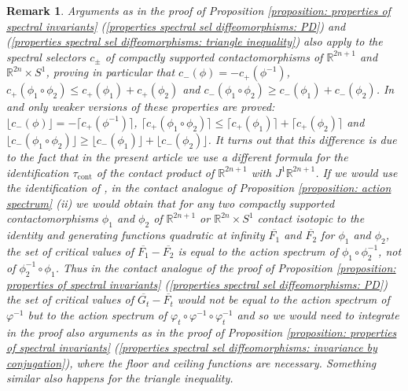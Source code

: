 \documentclass{amsart}
\DeclareMathOperator{\cont}{cont}
\newtheorem{remark}[thm]{Remark}
\theoremstyle{remark}
\begin{document}
\begin{remark}\label{remark: properties for contactomorphisms}
Arguments as in the proof
of Proposition \ref{proposition: properties of spectral invariants}
(\ref{properties spectral sel diffeomorphisms: PD})
and (\ref{properties spectral sel diffeomorphisms: triangle inequality})
also apply
to the spectral selectors $c_{\pm}$
of compactly supported contactomorphisms
of $\mathbb{R}^{2n+1}$ and $\mathbb{R}^{2n} \times S^1$,
proving in particular that $c_-(\phi) = - c_+ (\phi^{-1})$,
$c_+ (\phi_1 \circ \phi_2) \leq c_+ (\phi_1) + c_+ (\phi_2)$
and $c_- (\phi_1 \circ \phi_2) \geq c_- (\phi_1) + c_- (\phi_2)$.
In \cite{San11} and \cite{San10}
only weaker versions of these properties are proved:
$\lfloor c_-(\phi) \rfloor = - \lceil c_+ (\phi^{-1}) \rceil$,
$\lceil c_+ (\phi_1 \circ \phi_2) \rceil \leq
\lceil c_+ (\phi_1) \rceil + \lceil c_+ (\phi_2) \rceil$
and $\lfloor c_- (\phi_1 \circ \phi_2) \rfloor
\geq \lfloor c_- (\phi_1) \rfloor + \lfloor c_- (\phi_2) \rfloor$.
It turns out that this difference is due to the fact that
in the present article we use a different formula
for the identification $\tau_{\cont}$
of the contact product of $\mathbb{R}^{2n+1}$
with $J^1\mathbb{R}^{2n+1}$.
If we would use the identification of \cite{San11, San10},
in the contact analogue of Proposition \ref{proposition: action spectrum} (ii)
we would obtain that
for any two compactly supported contactomorphisms
$\phi_1$ and $\phi_2$ of $\mathbb{R}^{2n+1}$ or $\mathbb{R}^{2n} \times S^1$
contact isotopic to the identity
and generating functions quadratic at infinity
$\overline{F_1}$ and $\overline{F_2}$
for $\phi_1$ and $\phi_2$,
the set of critical values
of $\overline{F_1} - \overline{F_2}$
is equal to the action spectrum of $\phi_1 \circ \phi_2^{-1}$,
not of $\phi_2^{-1} \circ \phi_1$.
Thus in the contact analogue of the proof
of Proposition \ref{proposition: properties of spectral invariants}
(\ref{properties spectral sel diffeomorphisms: PD})
the set of critical values of $\overline{G_t} - \overline{F_t}$
would not be equal to the action spectrum of $\varphi^{-1}$
but to the action spectrum of $\varphi_t \circ \varphi^{-1} \circ \varphi_t^{-1}$
and so we would need to integrate in the proof
also arguments as in the proof of 
Proposition \ref{proposition: properties of spectral invariants}
(\ref{properties spectral sel diffeomorphisms: invariance by conjugation}),
where the floor and ceiling functions
are necessary.
Something similar also happens
for the triangle inequality.
\end{remark}
\end{document}

